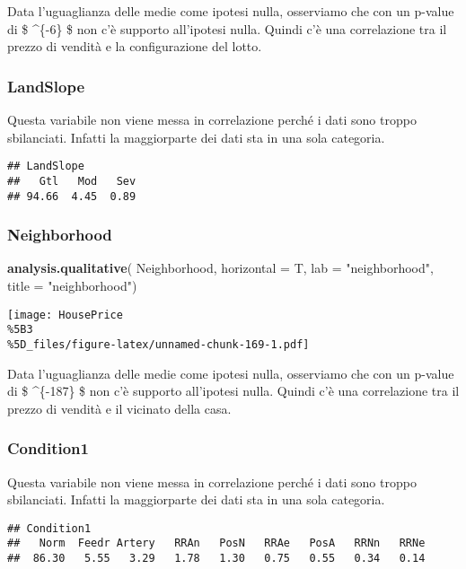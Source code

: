 \documentclass[
]{article}
\newenvironment{Shaded}{\begin{snugshade}}{\end{snugshade}}
\newcommand{\AttributeTok}[1]{\textcolor[rgb]{0.13,0.29,0.53}{#1}}
\newcommand{\FunctionTok}[1]{\textcolor[rgb]{0.13,0.29,0.53}{\textbf{#1}}}
\newcommand{\NormalTok}[1]{#1}
\newcommand{\StringTok}[1]{\textcolor[rgb]{0.31,0.60,0.02}{#1}}
\begin{document}
Data l'uguaglianza delle medie come ipotesi nulla, osserviamo che con un
p-value di \$ \^{}\{-6\} \$ non c'è supporto all'ipotesi
nulla. Quindi c'è una correlazione tra il prezzo di vendità e la
configurazione del lotto.

\subsubsection{LandSlope}\label{landslope-1}

Questa variabile non viene messa in correlazione perché i dati sono
troppo sbilanciati. Infatti la maggiorparte dei dati sta in una sola
categoria.

\begin{verbatim}
## LandSlope
##   Gtl   Mod   Sev 
## 94.66  4.45  0.89
\end{verbatim}

\subsubsection{Neighborhood}\label{neighborhood-1}

\begin{Shaded}
\begin{Highlighting}[]
\FunctionTok{analysis.qualitative}\NormalTok{(}
\NormalTok{    Neighborhood,}
    \AttributeTok{horizontal =}\NormalTok{ T,}
    \AttributeTok{lab =} \StringTok{"neighborhood"}\NormalTok{,}
    \AttributeTok{title =} \StringTok{"neighborhood"}\NormalTok{)}
\end{Highlighting}
\end{Shaded}

\texttt{[image: HousePrice\\\%5B3\\\%5D\_files/figure-latex/unnamed-chunk-169-1.pdf]}

Data l'uguaglianza delle medie come ipotesi nulla, osserviamo che con un
p-value di \$ \^{}\{-187\} \$ non c'è supporto all'ipotesi
nulla. Quindi c'è una correlazione tra il prezzo di vendità e il
vicinato della casa.

\subsubsection{Condition1}\label{condition1-1}

Questa variabile non viene messa in correlazione perché i dati sono
troppo sbilanciati. Infatti la maggiorparte dei dati sta in una sola
categoria.

\begin{verbatim}
## Condition1
##   Norm  Feedr Artery   RRAn   PosN   RRAe   PosA   RRNn   RRNe 
##  86.30   5.55   3.29   1.78   1.30   0.75   0.55   0.34   0.14
\end{verbatim}
\end{document}
